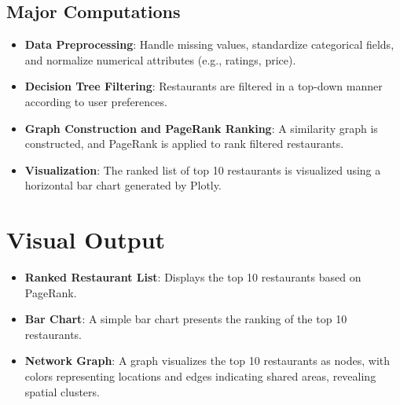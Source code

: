 \documentclass[fontsize=11pt]{article}
\begin{document}
\subsection*{Major Computations}
\begin{itemize}
    \item \textbf{Data Preprocessing}: Handle missing values, standardize categorical fields, and normalize numerical attributes (e.g., ratings, price). 
    \item \textbf{Decision Tree Filtering}: Restaurants are filtered in a top-down manner according to user preferences.
    \item \textbf{Graph Construction and PageRank Ranking}: A similarity graph is constructed, and PageRank is applied to rank filtered restaurants.
    \item \textbf{Visualization}: The ranked list of top 10 restaurants is visualized using a horizontal bar chart generated by Plotly.
\end{itemize}

\section*{Visual Output}
\begin{itemize}
    \item \textbf{Ranked Restaurant List}: Displays the top 10 restaurants based on PageRank.
    \item \textbf{Bar Chart}: A simple bar chart presents the ranking of the top 10 restaurants.
    \item \textbf{Network Graph}: A graph visualizes the top 10 restaurants as nodes, with colors representing locations and edges indicating shared areas, revealing spatial clusters.
\end{itemize}
\end{document}
